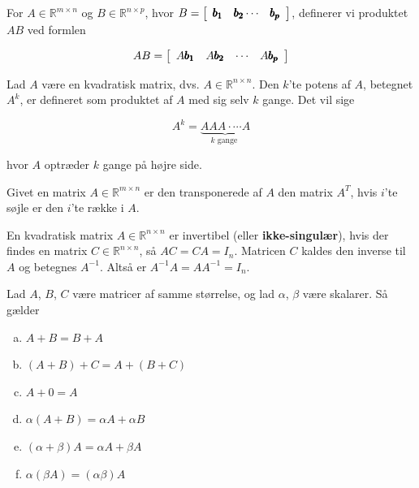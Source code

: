 \begin{definition}
    For $A \in \mathbb{R}^{m \times n}$ og $B \in \mathbb{R}^{n \times p}$, hvor $B=\left[\begin{array}{lll}\pmb{b_1} & \pmb{b_2} \cdots & \pmb{b_p}\end{array}\right]$, definerer vi produktet $A B$ ved formlen

\[
A B=\left[\begin{array}{llll}
A \pmb{b_1} & A \pmb{b_2} & \cdots & A \pmb{b_p}
\end{array}\right]
\]

\end{definition}

\begin{definition}
    Lad $A$ være en kvadratisk matrix, dvs. $ A \in \mathbb{R}^{n \times n}$. Den $k$'te potens af $A$, betegnet $A^k$, er defineret som produktet af $A$ med sig selv $k$ gange. Det vil sige

    $$
    A^k=\underbrace{ AAA \cdot \cdots A}_{k \text { gange }}
    $$

    hvor $A$ optræder $k$ gange på højre side.
\end{definition}

\begin{definition}
    Givet en matrix $A \in \mathbb{R}^{m \times n}$ er den transponerede af $A$ den matrix $A^T$, hvis $i$'te søjle er den $i$'te række i $A$.
\end{definition}

\begin{definition}
    En kvadratisk matrix \( A \in \mathbb{R}^{n \times n} \) er invertibel (eller \textbf{ikke-singulær}), hvis der findes en matrix \( C \in \mathbb{R}^{n \times n} \), så \( A C = C A = I_n \). Matricen \( C \) kaldes den inverse til \( A \) og betegnes \( A^{-1} \). Altså er \( A^{-1} A = A A^{-1} = I_n \).
\end{definition}

\begin{theorem}

    Lad $A$, $B$, $C$ være matricer af samme størrelse, og lad $\alpha$, $\beta$ være skalarer. Så gælder
    \begin{enumerate}[(a)]
        \item $A+B=B+A$
        \item $(A+B)+C=A+(B+C)$
        \item $A+0=A$
        \item $\alpha(A+B)=\alpha A+\alpha B$
        \item $(\alpha+\beta) A=\alpha A+\beta A$
        \item $\alpha(\beta A)=(\alpha \beta) A$
    \end{enumerate}
\end{theorem}

